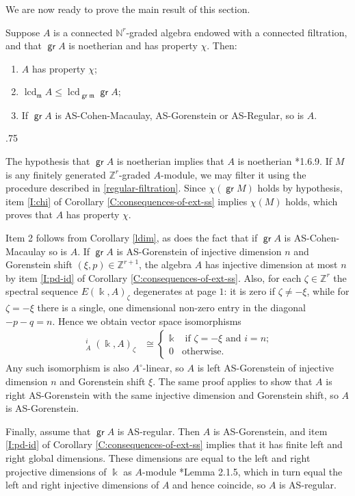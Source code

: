 \documentclass[11pt,fleqn]{article}
\makeatletter
\renewenvironment{proof}[1][\textit{Proof}]{\par
  \pushQED{\qed}%
  \normalfont \topsep.75\paraskip\relax
  \trivlist
  \item[\hskip\labelsep
        \itshape
    #1\@addpunct{.}]\ignorespaces
}{%
  \popQED\endtrivlist\@endpefalse
}
\newcommand\NN{\mathbb N}
\newcommand\ZZ{\mathbb Z}
\renewcommand\k{\Bbbk}
\newcommand\m{\mathfrak m}
\newcommand\opp{\circ}
\DeclareMathOperator\GrExt{\underline{\mathsf{Ext}}}
\DeclareMathOperator\gr{\mathsf{gr}}
\DeclareMathOperator\lcd{lcd}
\makeatother
\begin{document}

We are now ready to prove the main result of this section. 
\begin{Theorem}
\label{transfer}
Suppose $A$ is a connected $\NN^r$-graded algebra endowed with a connected 
filtration, and that $\gr A$ is noetherian and has property $\chi$. Then:
\begin{enumerate}
\item $A$ has property $\chi$;
\item $\lcd_\m A \leq \lcd_{\gr \m} \gr A$;
\item If $\gr A$ is AS-Cohen-Macaulay, AS-Gorenstein or AS-Regular, so is $A$.
\end{enumerate}
\end{Theorem}
\begin{proof}
The hypothesis that $\gr A$ is noetherian implies that $A$ is noetherian \cite{MR}*{1.6.9}. 
If $M$ is any finitely generated $\ZZ^r$-graded $A$-module, we may filter it using the procedure
described in \ref{regular-filtration}. Since $\chi(\gr M)$ holds by hypothesis, item 
\ref{I:chi} of Corollary \ref{C:consequences-of-ext-ss} implies $\chi(M)$ holds, which 
proves that $A$ has property $\chi$. 

Item 2 follows from Corollary \ref{ldim}, as does the fact that if $\gr A$ is
AS-Cohen-Macaulay so is $A$. If $\gr A$ is AS-Gorenstein of injective dimension $n$ and
Gorenstein shift $(\xi, p) \in \ZZ^{r+1}$, the algebra $A$ has injective dimension at 
most $n$ by item \ref{I:pd-id} of Corollary \ref{C:consequences-of-ext-ss}. Also, for 
each $\zeta \in \ZZ^r$ the spectral sequence $E(\k, A)_\zeta$ degenerates at page $1$: 
it is zero if $\zeta \neq -\xi$, while for $\zeta = - \xi$ there is a single, one 
dimensional non-zero entry in the diagonal $-p-q = n$. Hence we obtain vector space
isomorphisms
\begin{align*}
  \GrExt^i_A(\k, A)_\zeta 
    &\cong  \begin{cases}
      \k & \mbox{ if  $\zeta = -\xi$ and $i = n$;} \\
      0 & \mbox{otherwise.}
    \end{cases}
\end{align*}
Any such isomorphism is also $A^\opp$-linear, so $A$ is left AS-Gorenstein of injective 
dimension $n$ and Gorenstein shift $\xi$. The same proof applies to show that $A$ is 
right AS-Gorenstein with the same injective dimension and Gorenstein shift, so $A$ is 
AS-Gorenstein. 

Finally, assume that $\gr A$ is AS-regular. Then $A$ is AS-Gorenstein, and item
\ref{I:pd-id} of Corollary \ref{C:consequences-of-ext-ss} implies that it has finite
left and right global dimensions. These dimensions are equal to the left and right 
projective dimensions of $\k$ as $A$-module \cite{RZ2}*{Lemma 2.1.5}, which in turn equal
the left and right injective dimensions of $A$ and hence coincide, so $A$ is AS-regular.
\end{proof}
\end{document}
